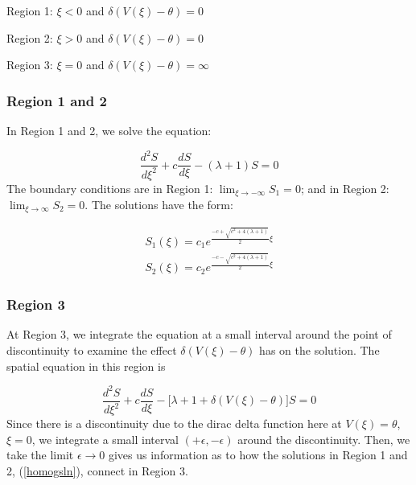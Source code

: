 \documentclass[12pt]{article}
\begin{document}
Region 1: $\xi < 0$ and $\delta(V(\xi)-\theta) = 0$

Region 2: $\xi > 0$ and $\delta(V(\xi)-\theta) = 0$ 

Region 3: $\xi = 0$ and $\delta(V(\xi)-\theta) = \infty$

\subsubsection{ Region 1 and 2}
In Region 1 and 2, we solve the equation:

\begin{equation}
\frac{d^2S}{d\xi^2} + c\frac{dS}{d\xi} - (\lambda + 1)S = 0
\end{equation} 
The boundary conditions are in Region 1: $\lim_{\xi \to -\infty}S_1 = 0$; and in Region 2: $\lim_{\xi \to \infty}S_2 = 0$. The solutions have the form:

\begin{equation} \label{homogsln}
\begin{aligned}
S_1(\xi) = c_1e^{\frac{-c+\sqrt{c^2+4(\lambda+1)}}{2}\xi} \\
S_2(\xi) = c_2e^{\frac{-c-\sqrt{c^2+4(\lambda+1)}}{2}\xi} 
\end{aligned}
\end{equation}

\subsubsection{Region 3}
At Region 3, we integrate the equation at a small interval around the point of discontinuity to examine the effect $\delta(V(\xi)-\theta)$ has on the solution. The spatial equation in this region is 

\begin{equation}
\frac{d^2S}{d\xi^2} + c\frac{dS}{d\xi} - \big[\lambda + 1 + \delta(V(\xi)-\theta)\big]S = 0
\end{equation} 
Since there is a discontinuity due to the dirac delta function here at $V(\xi) = \theta$, $\xi = 0$, we integrate a small interval $(+\epsilon,-\epsilon)$ around the discontinuity. Then, we take the limit $\epsilon \to 0$ gives us information as to how the solutions in Region 1 and 2, (\ref{homogsln}), connect in Region 3.
\end{document}
